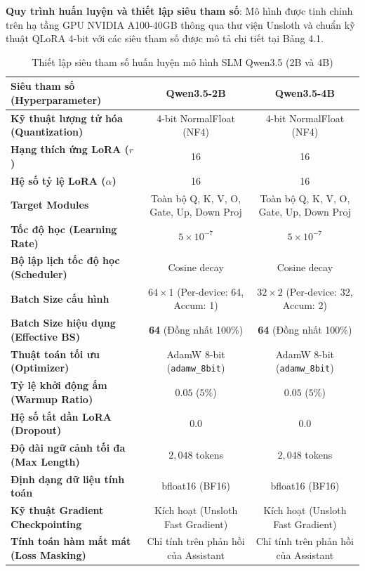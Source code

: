 \textbf{Quy trình huấn luyện và thiết lập siêu tham số}:
Mô hình được tinh chỉnh trên hạ tầng GPU NVIDIA A100-40GB thông qua thư viện Unsloth và chuẩn kỹ thuật QLoRA 4-bit với các siêu tham số được mô tả chi tiết tại Bảng 4.1.


\begin{table}[htbp]
    \centering
    \caption{Thiết lập siêu tham số huấn luyện mô hình SLM Qwen3.5 (2B và 4B)}
    \label{tab:bảng_4_1}
    \begin{tabular}{lcc}
        \toprule
        \textbf{Siêu tham số (Hyperparameter)} & \textbf{Qwen3.5-2B} & \textbf{Qwen3.5-4B} \\
        \midrule
        \textbf{Kỹ thuật lượng tử hóa (Quantization)} & 4-bit NormalFloat (NF4) & 4-bit NormalFloat (NF4) \\
        \textbf{Hạng thích ứng LoRA ($r$)} & 16 & 16 \\
        \textbf{Hệ số tỷ lệ LoRA ($\alpha$)} & 16 & 16 \\
        \textbf{Target Modules} & Toàn bộ Q, K, V, O, Gate, Up, Down Proj & Toàn bộ Q, K, V, O, Gate, Up, Down Proj \\
        \textbf{Tốc độ học (Learning Rate)} & $5 \times 10^{-7}$ & $5 \times 10^{-7}$ \\
        \textbf{Bộ lập lịch tốc độ học (Scheduler)} & Cosine decay & Cosine decay \\
        \textbf{Batch Size cấu hình} & $64 \times 1$ (Per-device: 64, Accum: 1) & $32 \times 2$ (Per-device: 32, Accum: 2) \\
        \textbf{Batch Size hiệu dụng (Effective BS)} & \textbf{64} (Đồng nhất 100\%) & \textbf{64} (Đồng nhất 100\%) \\
        \textbf{Thuật toán tối ưu (Optimizer)} & AdamW 8-bit (\texttt{adamw_8bit}) & AdamW 8-bit (\texttt{adamw_8bit}) \\
        \textbf{Tỷ lệ khởi động ấm (Warmup Ratio)} & $0.05$ ($5\%$) & $0.05$ ($5\%$) \\
        \textbf{Hệ số tắt dần LoRA (Dropout)} & $0.0$ & $0.0$ \\
        \textbf{Độ dài ngữ cảnh tối đa (Max Length)} & $2{,}048$ tokens & $2{,}048$ tokens \\
        \textbf{Định dạng dữ liệu tính toán} & bfloat16 (BF16) & bfloat16 (BF16) \\
        \textbf{Kỹ thuật Gradient Checkpointing} & Kích hoạt (Unsloth Fast Gradient) & Kích hoạt (Unsloth Fast Gradient) \\
        \textbf{Tính toán hàm mất mát (Loss Masking)} & Chỉ tính trên phản hồi của Assistant & Chỉ tính trên phản hồi của Assistant \\
        \bottomrule
    \end{tabular}
\end{table}


